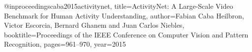 @inproceedings{caba2015activitynet,
  title={ActivityNet: A Large-Scale Video Benchmark for Human Activity Understanding},
  author={Fabian Caba Heilbron, Victor Escorcia, Bernard Ghanem and Juan Carlos Niebles},
  booktitle={Proceedings of the IEEE Conference on Computer Vision and Pattern Recognition},
  pages={961--970},
  year={2015}
}
